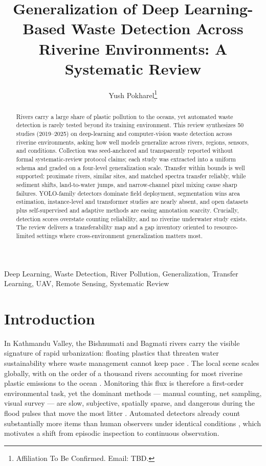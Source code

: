 \documentclass[12pt]{article}
\title{Generalization of Deep Learning-Based Waste Detection Across Riverine Environments: A Systematic Review}
\author{Yush Pokharel\thanks{Affiliation To Be Confirmed. Email: TBD.}}
\date{}
\begin{document}
\maketitle

\begin{abstract}
Rivers carry a large share of plastic pollution to the oceans, yet automated waste detection is rarely tested beyond its training environment. This review synthesizes 50 studies (2019--2025) on deep-learning and computer-vision waste detection across riverine environments, asking how well models generalize across rivers, regions, sensors, and conditions. Collection was seed-anchored and transparently reported without formal systematic-review protocol claims; each study was extracted into a uniform schema and graded on a four-level generalization scale. Transfer within bounds is well supported: proximate rivers, similar sites, and matched spectra transfer reliably, while sediment shifts, land-to-water jumps, and narrow-channel pixel mixing cause sharp failures. YOLO-family detectors dominate field deployment, segmentation wins area estimation, instance-level and transformer studies are nearly absent, and open datasets plus self-supervised and adaptive methods are easing annotation scarcity. Crucially, detection scores overstate counting reliability, and no riverine underwater study exists. The review delivers a transferability map and a gap inventory oriented to resource-limited settings where cross-environment generalization matters most.
\end{abstract}

\begin{keywords}
Deep Learning, Waste Detection, River Pollution, Generalization, Transfer Learning, UAV, Remote Sensing, Systematic Review
\end{keywords}

\section{Introduction}
\label{sec:introduction}

In Kathmandu Valley, the Bishnumati and Bagmati rivers carry the visible signature of rapid urbanization: floating plastics that threaten water sustainability where waste management cannot keep pace \cite{Pati2025}. The local scene scales globally, with on the order of a thousand rivers accounting for most riverine plastic emissions to the ocean \cite{Meijer2021}. Monitoring this flux is therefore a first-order environmental task, yet the dominant methods --- manual counting, net sampling, visual survey --- are slow, subjective, spatially sparse, and dangerous during the flood pulses that move the most litter \cite{Lieshout2020,Hurley2023}. Automated detectors already count substantially more items than human observers under identical conditions \cite{Lieshout2020}, which motivates a shift from episodic inspection to continuous observation.
\end{document}
